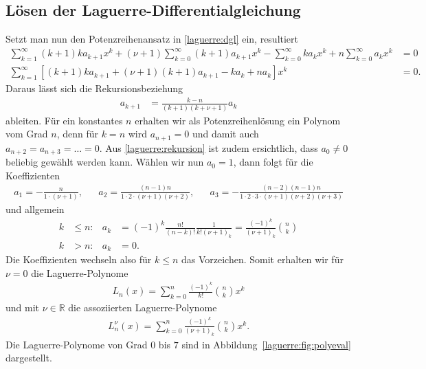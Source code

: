 \subsection{Lösen der Laguerre-Differentialgleichung}
Setzt man nun den Potenzreihenansatz in
\eqref{laguerre:dgl}
ein,
resultiert
\begin{align*}
\sum_{k=1}^\infty (k+1) k a_{k+1} x^k
+
(\nu + 1)\sum_{k=0}^\infty (k+1) a_{k+1} x^k
-
\sum_{k=0}^\infty k a_k x^k
+
n \sum_{k=0}^\infty a_k x^k
 & =
0    \\
\sum_{k=1}^\infty
\left[ (k+1) k a_{k+1} + (\nu + 1)(k+1) a_{k+1} - k a_k + n a_k \right] x^k
 & =
0.
\end{align*}
Daraus lässt sich die Rekursionsbeziehung
\begin{align}
a_{k+1}
 & =
\frac{k-n}{(k+1) (k + \nu + 1)} a_k
\label{laguerre:rekursion}
\end{align}
ableiten.
Für ein konstantes $n$ erhalten wir als Potenzreihenlösung ein Polynom vom Grad
$n$,
denn für $k=n$ wird $a_{n+1} = 0$ und damit auch $a_{n+2}=a_{n+3}=\ldots=0$.
Aus %
\eqref{laguerre:rekursion} ist zudem ersichtlich,
dass $a_0 \neq 0$ beliebig gewählt werden kann.
Wählen wir nun $a_0 = 1$, dann folgt für die Koeffizienten
\begin{align*}
a_1
=
-\frac{n}{1 \cdot (\nu + 1)}
, &  &
a_2
=
\frac{(n-1)n}{1 \cdot 2 \cdot (\nu + 1)(\nu + 2)}
, &  &
a_3
=
-\frac{(n-2)(n-1)n}{1 \cdot 2 \cdot 3 \cdot (\nu + 1)(\nu + 2)(\nu + 3)}
\end{align*}
und allgemein
\begin{align*}
k
  & \leq
n:
  &
a_k
  & =
(-1)^k \frac{n!}{(n-k)!} \frac{1}{k!(\nu + 1)_k}
=
\frac{(-1)^k}{(\nu + 1)_k} \binom{n}{k}
\\
k & >n:
  &
a_k
  & =
0
.
\end{align*}
Die Koeffizienten wechseln also für $k \leq n$ das Vorzeichen.
Somit erhalten wir für $\nu = 0$ die Laguerre-Polynome
\begin{align}
L_n(x)
=
\sum_{k=0}^{n} \frac{(-1)^k}{k!} \binom{n}{k} x^k
\label{laguerre:polynom}
\end{align}
und mit $\nu \in \mathbb{R}$ die assoziierten Laguerre-Polynome
\begin{align}
L_n^\nu(x)
=
\sum_{k=0}^{n} \frac{(-1)^k}{(\nu + 1)_k} \binom{n}{k} x^k.
\label{laguerre:allg_polynom}
\end{align}
Die Laguerre-Polynome von Grad $0$ bis $7$ sind in
Abbildung~\ref{laguerre:fig:polyeval} dargestellt.
